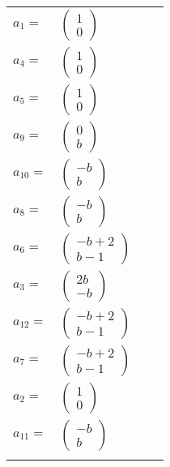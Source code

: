 \documentclass[1p]{elsarticle_modified}
\theoremstyle{definition}
\begin{document}
\begin{tabular}{m{7pt} m{180pt} m{7pt} m{180pt} }
\flushright $a_{1}=$&$\begin{pmatrix}1\\0\end{pmatrix}$ \\
\flushright $a_{4}=$&$\begin{pmatrix}1\\0\end{pmatrix}$ \\
\flushright $a_{5}=$&$\begin{pmatrix}1\\0\end{pmatrix}$ \\
\flushright $a_{9}=$&$\begin{pmatrix}0\\b\end{pmatrix}$ \\
\flushright $a_{10}=$&$\begin{pmatrix}- b\\b\end{pmatrix}$ \\
\flushright $a_{8}=$&$\begin{pmatrix}- b\\b\end{pmatrix}$ \\
\flushright $a_{6}=$&$\begin{pmatrix}- b+2\\b-1\end{pmatrix}$ \\
\flushright $a_{3}=$&$\begin{pmatrix}2 b\\- b\end{pmatrix}$ \\
\flushright $a_{12}=$&$\begin{pmatrix}- b+2\\b-1\end{pmatrix}$ \\
\flushright $a_{7}=$&$\begin{pmatrix}- b+2\\b-1\end{pmatrix}$ \\
\flushright $a_{2}=$&$\begin{pmatrix}1\\0\end{pmatrix}$ \\
\flushright $a_{11}=$&$\begin{pmatrix}- b\\b\end{pmatrix}$\\&\end{tabular}
\end{document}
